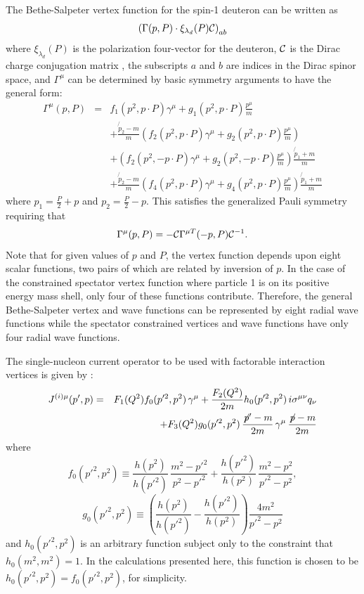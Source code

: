 \documentclass[mythesis.tex]{subfiles}
\begin{document}
The Bethe-Salpeter vertex function for the spin-1 deuteron can be written
as
%
\begin{equation}
\left( \Gamma(p,P)\cdot \xi_{\lambda_d}(P) {\cal C}\right)_{ab}
\end{equation}
where $\xi_{\lambda_d}(P)$ is the polarization four-vector for the deuteron,
$\cal C$ is the Dirac charge conjugation matrix ,
the subscripts $a$ and $b$ are indices in the Dirac spinor space, and
$\Gamma^\mu$ can be determined by basic symmetry arguments to have the
general form:
\begin{eqnarray}
%
\Gamma^\mu(p,P)&=&f_1(p^2,p\cdot P)\gamma^\mu
+ g_1(p^2,p\cdot P)\frac{p^\mu}{m}\nonumber\\
& &+\frac{\not{\!p}_2-m}{m}\left( f_2(p^2,p\cdot P)\gamma^\mu
+g_2(p^2,p\cdot P)\frac{p^\mu}{m}\right)\nonumber\\
& &+\left( f_2(p^2,-p\cdot P)\gamma^\mu
+g_2(p^2,-p\cdot P)\frac{p^\mu}{m}\right) \frac{\not{\!p}_1+m}{m}\nonumber\\
& &+\frac{\not{\!p}_2-m}{m}\left( f_4(p^2,p\cdot P)\gamma^\mu
+g_4(p^2,p\cdot P)\frac{p^\mu}{m}\right) \frac{\not{\!p}_1+m}{m}
\end{eqnarray}
%
where $p_1=\frac{P}{2}+p$ and  $p_2=\frac{P}{2}-p$.
This satisfies the generalized Pauli symmetry requiring that
%
\begin{equation}
\Gamma^\mu(p,P)=-{\cal C}\Gamma^{\mu T}(-p,P){\cal C}^{-1}.
\end{equation}
%
Note that for given values of $p$ and $P$, the vertex function depends upon
eight scalar functions, two pairs of which are related by inversion of $p$.
In the case of the constrained spectator vertex function where particle 1
is on its positive energy mass shell, only four of these functions
contribute. Therefore, the general Bethe-Salpeter vertex and wave functions
can be represented by eight radial wave functions while the spectator
constrained vertices and wave functions have only four radial wave
functions.

The single-nucleon current operator to be used with factorable interaction
vertices is given by \cite{GrossandRiska}:
%
\begin{eqnarray}
\vspace{12pt}
J^{(i)\mu} (p',p) &= &F_1(Q^2) f_0(p'^2,p^2) \,  \gamma^\mu +
\frac{F_2(Q^2)}{2m} h_0(p'^2,p^2) \, i \sigma^{\mu \nu}
q_\nu \nonumber\\
& & + F_3(Q^2) g_0(p'^2,p^2) \,  \frac{\not{\!p}'-m}{2m} \,  \gamma^\mu  \,
 \frac{\not{\!p}-m}{2m} \label{offshellcur}
\end{eqnarray}
%
where
%
\begin{equation}
f_0(p'^2,p^2) \equiv \frac{h(p^2)}{h(p'^2)} \,  \frac{m^2-p'^2}{p^2-p'^2}+
\frac{h(p'^2)}{h(p^2)}  \, \frac{m^2-p^2}{p'^2-p^2},
\end{equation}
%
\begin{equation}
g_0(p'^2,p^2) \equiv \left( \frac{h(p^2)}{h(p'^2)}-\frac{h(p'^2)}{h(p^2)}
\right) \frac{4m^2}{p'^2-p^2}
\end{equation}
%
and $h_0(p'^2,p^2)$ is an arbitrary function subject only to the constraint
that $h_0(m^2,m^2)=1$. In the calculations presented here, this function is
chosen to be $h_0(p'^2,p^2)=f_0(p'^2,p^2)$, for simplicity.
\end{document}
